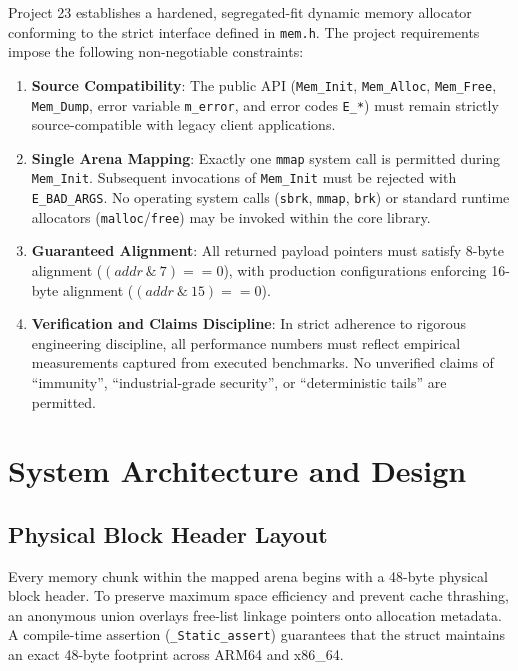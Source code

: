 \documentclass[11pt,a4paper]{article}
\begin{document}
Project 23 establishes a hardened, segregated-fit dynamic memory allocator conforming to the strict interface defined in \texttt{mem.h}. The project requirements impose the following non-negotiable constraints:
\begin{enumerate}
    \item \textbf{Source Compatibility}: The public API (\texttt{Mem\_Init}, \texttt{Mem\_Alloc}, \texttt{Mem\_Free}, \texttt{Mem\_Dump}, error variable \texttt{m\_error}, and error codes \texttt{E\_*}) must remain strictly source-compatible with legacy client applications.
    \item \textbf{Single Arena Mapping}: Exactly one \texttt{mmap} system call is permitted during \texttt{Mem\_Init}. Subsequent invocations of \texttt{Mem\_Init} must be rejected with \texttt{E\_BAD\_ARGS}. No operating system calls (\texttt{sbrk}, \texttt{mmap}, \texttt{brk}) or standard runtime allocators (\texttt{malloc}/\texttt{free}) may be invoked within the core library.
    \item \textbf{Guaranteed Alignment}: All returned payload pointers must satisfy 8-byte alignment ($(addr \ \& \ 7) == 0$), with production configurations enforcing 16-byte alignment ($(addr \ \& \ 15) == 0$).
    \item \textbf{Verification and Claims Discipline}: In strict adherence to rigorous engineering discipline, all performance numbers must reflect empirical measurements captured from executed benchmarks. No unverified claims of ``immunity'', ``industrial-grade security'', or ``deterministic tails'' are permitted.
\end{enumerate}

\section{System Architecture and Design}

\subsection{Physical Block Header Layout}
Every memory chunk within the mapped arena begins with a 48-byte physical block header. To preserve maximum space efficiency and prevent cache thrashing, an anonymous union overlays free-list linkage pointers onto allocation metadata. A compile-time assertion (\texttt{\_Static\_assert}) guarantees that the struct maintains an exact 48-byte footprint across ARM64 and x86\_64.
\end{document}
